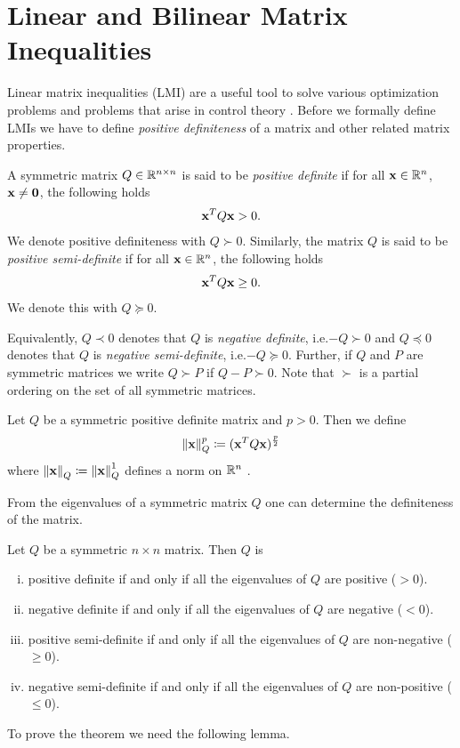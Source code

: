 \documentclass[a4paper,12pt,twoside,BCOR=10mm]{scrbook}
\begin{document}
\section{Linear and Bilinear Matrix Inequalities}\label{SectionLMIBMI}
Linear matrix inequalities (LMI) are a useful tool to solve various optimization problems and problems that arise in control theory \citep{BGFB1994LMIincontrol, BlMi2008setbook, chesi2010LMIsurvey, FSO2013fuzzylya, chesi2009, HaTi2002cdc}. Before we formally define LMIs we have to define \emph{positive definiteness} of a matrix and other related matrix properties.
\begin{definition}\label{Definition PosDef}
A symmetric matrix $Q\in\mathbb{R}^{n\times n}$ is said to be \emph{positive definite} if for all $\mathbf{x}\in \mathbb{R}^{n}$, $\mathbf{x} \neq \mathbf{0}$, the following holds
\begin{align*}
    \mathbf{x}^T Q \mathbf{x} > 0.
\end{align*}
We denote positive definiteness with $Q \succ 0$. Similarly, the matrix $Q$ is said to be \emph{positive semi-definite} if for all $\mathbf{x} \in \mathbb{R}^{n}$, the following holds
\begin{align*}
    \mathbf{x}^T Q \mathbf{x} \geq 0.
\end{align*}
We denote this with $Q \succeq 0$.
\end{definition}
Equivalently, $Q \prec 0$ denotes that $Q$ is \emph{negative definite}, i.e.\@ $-Q \succ 0$ and $Q \preceq 0$ denotes that $Q$ is \emph{negative semi-definite}, i.e.\@ $-Q \succeq 0$. Further, if $Q$ and $P$ are symmetric matrices we write $Q \succ P$ if $Q - P \succ 0$. Note that $\succ$ is a partial ordering on the set of all symmetric matrices.

Let $Q$ be a symmetric positive definite matrix and $p > 0$. Then we define
\begin{align*}
    \left\lVert\mathbf{x}\right\rVert_Q^p \coloneqq (\mathbf{x}^T Q \mathbf{x})^\frac{p}{2}
\end{align*}
where $\left\lVert\mathbf{x}\right\rVert_{Q}^{} \coloneqq \left\lVert\mathbf{x}\right\rVert_{Q}^{1}$ defines a norm on $\mathbb{R}^{n}$ \citep{terrell2009stability}.

From the eigenvalues of a symmetric matrix $Q$ one can determine the definiteness of the matrix.
\begin{theorem}\label{ThmPosDefPosEig}
Let $Q$ be a symmetric $n\times n$ matrix. Then $Q$ is
\begin{enumerate}[i)]
    \item positive definite if and only if all the eigenvalues of $Q$ are positive ($>0$).
    \item negative definite if and only if all the eigenvalues of $Q$ are negative ($<0$).
    \item positive semi-definite if and only if all the eigenvalues of $Q$ are non-negative ($\geq 0$).
    \item negative semi-definite if and only if all the eigenvalues of $Q$ are non-positive ($\leq 0$).
\end{enumerate}
\end{theorem}
To prove the theorem we need the following lemma.
\end{document}
